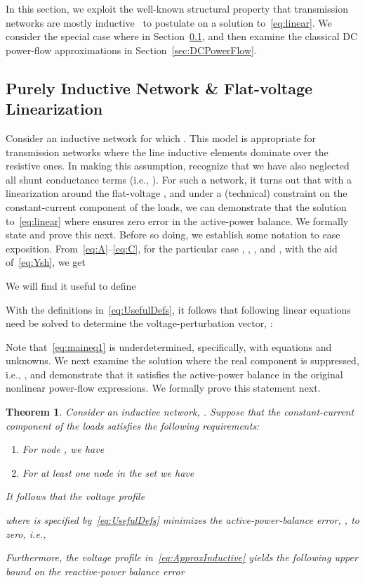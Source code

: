 \documentclass[10 pt, conference]{ieeeconf}
\newtheorem{theorem}{Theorem}
\begin{document}
In this section, we exploit the well-known structural property that transmission networks are mostly inductive~\cite{Wood:1996} to postulate on a solution to~\eqref{eq:linear}. We consider the special case where  in Section~\ref{sec:inductive}, and then examine the classical DC power-flow approximations in Section~\ref{sec:DCPowerFlow}. 

\subsection{Purely Inductive Network \& Flat-voltage Linearization} \label{sec:inductive}
Consider an inductive network for which .  This model is appropriate for transmission networks where the line inductive elements dominate over the resistive ones. In making this assumption, recognize that we have also neglected all shunt conductance terms (i.e., ). For such a network, it turns out that with a linearization around the flat-voltage , and under a (technical) constraint on the constant-current component of the  loads, we can demonstrate that the solution to~\eqref{eq:linear} where  ensures zero error in the active-power balance. We formally state and prove this next. Before so doing, we establish some notation to ease exposition. From~\eqref{eq:A}--\eqref{eq:C}, for the particular case , , , and , with the aid of~\eqref{eq:Ysh}, we get

We will find it useful to define

With the definitions in~\eqref{eq:UsefulDefs}, it follows that following linear equations need be solved to determine the voltage-perturbation vector, :

Note that~\eqref{eq:maineq1} is underdetermined, specifically, with  equations and  unknowns. We next examine the solution where the real component is suppressed, i.e., , and demonstrate that it  satisfies the active-power balance in the original nonlinear power-flow expressions. We formally prove this statement next. 

\begin{theorem}
\label{prop:inductive_main}
Consider an inductive network, . Suppose that the constant-current component of the  loads satisfies the following requirements:
\begin{enumerate}
\item For node , we have

\item For at least one node in the set  we have 

\end{enumerate}
It follows that the voltage profile

where  is specified by~\eqref{eq:UsefulDefs} minimizes the active-power-balance error, , to zero, i.e., 

Furthermore, the voltage profile in~\eqref{eq:ApproxInductive} yields the following upper bound on the reactive-power balance error
\end{theorem}
\end{document}
